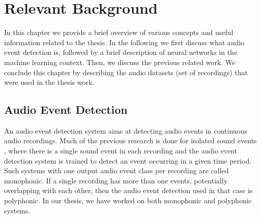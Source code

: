\chapter{Relevant Background}
In this chapter we provide a brief overview of various concepts and useful information related to the thesis. In the following we first discuss what audio event detection is, followed by a brief description of neural networks in the machine learning context. Then, we discuss the previous related work. We conclude this chapter by describing the audio datasets (set of recordings) that were used in the thesis work.

\section{Audio Event Detection}
An audio event detection system aims at detecting audio events in continuous audio recordings. Much of the previous research is done for isolated sound events \cite{gencoglu2014recognition}, where there is a single sound event in each recording and the audio event detection system is trained to detect an event occurring in a given time period. Such systems with one output audio event class per recording are called monophonic. If a single recording has more than one events, potentially overlapping with each other, then the audio event detection used in that case is polyphonic. In our thesis, we have worked on both monophonic and polyphonic systems. 

